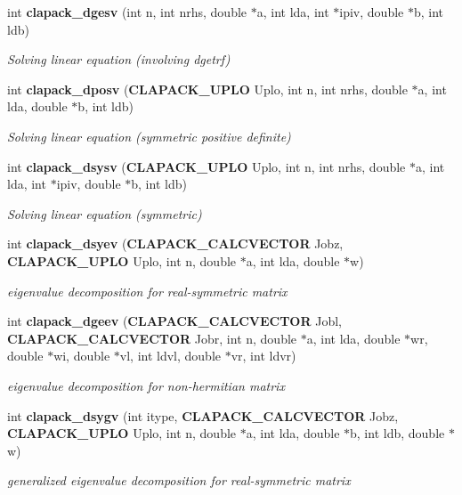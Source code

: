 \begin{DoxyCompactItemize}
int {\bf clapack\-\_\-dgesv} (int n, int nrhs, double $\ast$a, int lda, int $\ast$ipiv, double $\ast$b, int ldb)
\begin{DoxyCompactList}\small\item\em Solving linear equation (involving dgetrf) \end{DoxyCompactList}\item 
int {\bf clapack\-\_\-dposv} ({\bf C\-L\-A\-P\-A\-C\-K\-\_\-\-U\-P\-L\-O} Uplo, int n, int nrhs, double $\ast$a, int lda, double $\ast$b, int ldb)
\begin{DoxyCompactList}\small\item\em Solving linear equation (symmetric positive definite) \end{DoxyCompactList}\item 
int {\bf clapack\-\_\-dsysv} ({\bf C\-L\-A\-P\-A\-C\-K\-\_\-\-U\-P\-L\-O} Uplo, int n, int nrhs, double $\ast$a, int lda, int $\ast$ipiv, double $\ast$b, int ldb)
\begin{DoxyCompactList}\small\item\em Solving linear equation (symmetric) \end{DoxyCompactList}\item 
int {\bf clapack\-\_\-dsyev} ({\bf C\-L\-A\-P\-A\-C\-K\-\_\-\-C\-A\-L\-C\-V\-E\-C\-T\-O\-R} Jobz, {\bf C\-L\-A\-P\-A\-C\-K\-\_\-\-U\-P\-L\-O} Uplo, int n, double $\ast$a, int lda, double $\ast$w)
\begin{DoxyCompactList}\small\item\em eigenvalue decomposition for real-\/symmetric matrix \end{DoxyCompactList}\item 
int {\bf clapack\-\_\-dgeev} ({\bf C\-L\-A\-P\-A\-C\-K\-\_\-\-C\-A\-L\-C\-V\-E\-C\-T\-O\-R} Jobl, {\bf C\-L\-A\-P\-A\-C\-K\-\_\-\-C\-A\-L\-C\-V\-E\-C\-T\-O\-R} Jobr, int n, double $\ast$a, int lda, double $\ast$wr, double $\ast$wi, double $\ast$vl, int ldvl, double $\ast$vr, int ldvr)
\begin{DoxyCompactList}\small\item\em eigenvalue decomposition for non-\/hermitian matrix \end{DoxyCompactList}\item 
int {\bf clapack\-\_\-dsygv} (int itype, {\bf C\-L\-A\-P\-A\-C\-K\-\_\-\-C\-A\-L\-C\-V\-E\-C\-T\-O\-R} Jobz, {\bf C\-L\-A\-P\-A\-C\-K\-\_\-\-U\-P\-L\-O} Uplo, int n, double $\ast$a, int lda, double $\ast$b, int ldb, double $\ast$w)
\begin{DoxyCompactList}\small\item\em generalized eigenvalue decomposition for real-\/symmetric matrix \end{DoxyCompactList}\item 

\end{DoxyCompactItemize}
